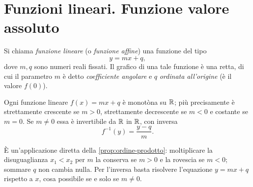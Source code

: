 \section{Funzioni lineari. Funzione valore assoluto}
\label{sec:lineari}

\begin{definizione}
Si chiama \emph{funzione lineare} (o \emph{funzione affine}) una funzione del tipo
\begin{equation}\label{eq:lineare}
  y=mx+q,
\end{equation}
dove $m,q$ sono numeri reali fissati. Il grafico di una tale funzione è una retta, di cui
il parametro $m$ è detto \emph{coefficiente angolare} e $q$ \emph{ordinata all'origine}
(è il valore $f(0)$).
\end{definizione}

\begin{proposizione}\label{prop:lineare-monotona}
Ogni funzione lineare $f(x)=mx+q$ è monotòna su $\mathbb{R}$; più precisamente è strettamente
crescente se $m>0$, strettamente decrescente se $m<0$ e costante se $m=0$. Se $m\neq0$
essa è invertibile da $\mathbb{R}$ in $\mathbb{R}$, con inversa
\begin{equation}\label{eq:inversa-lineare}
  f^{-1}(y)=\frac{y-q}{m}.
\end{equation}
\end{proposizione}

\begin{schema}
\end{schema}

\begin{strategia}
È un'applicazione diretta della \cref{prop:ordine-prodotto}: moltiplicare la
disuguaglianza $x_{1}<x_{2}$ per $m$ la conserva se $m>0$ e la rovescia se $m<0$;
sommare $q$ non cambia nulla. Per l'inversa basta risolvere l'equazione $y=mx+q$
rispetto a $x$, cosa possibile se e solo se $m\neq0$.
\end{strategia}


